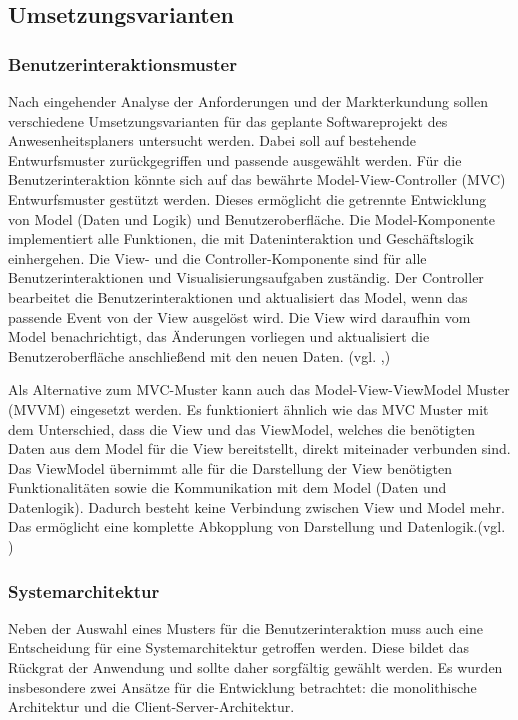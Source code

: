 \subsection{Umsetzungsvarianten}
\label{sec:Umsetzungsvarianten}


\subsubsection{Benutzerinteraktionsmuster}
\label{sec:Benutzerinteraktionsmuster}
Nach eingehender Analyse der Anforderungen und der Markterkundung sollen verschiedene Umsetzungsvarianten für das geplante Softwareprojekt des Anwesenheitsplaners untersucht werden. Dabei soll auf bestehende Entwurfsmuster zurückgegriffen und passende ausgewählt werden. Für die Benutzerinteraktion könnte sich auf das bewährte Model-View-Controller (MVC) Entwurfsmuster gestützt werden. Dieses ermöglicht die getrennte Entwicklung von Model (Daten und Logik) und Benutzeroberfläche. Die Model-Komponente implementiert alle Funktionen, die mit Dateninteraktion und Geschäftslogik einhergehen. Die View- und die Controller-Komponente sind für alle Benutzerinteraktionen und Visualisierungsaufgaben zuständig. Der Controller bearbeitet die Benutzerinteraktionen und aktualisiert das Model, wenn das passende Event von der View ausgelöst wird. Die View wird daraufhin vom Model benachrichtigt, das Änderungen vorliegen und aktualisiert die Benutzeroberfläche anschließend mit den neuen Daten. (vgl. \cite[S. 847 - 857]{goll2011},\cite{MVC})

Als Alternative zum MVC-Muster kann auch das Model-View-ViewModel Muster (MVVM) eingesetzt werden. Es funktioniert ähnlich wie das MVC Muster mit dem Unterschied, dass die View und das ViewModel, welches die benötigten Daten aus dem Model für die View bereitstellt, direkt miteinader verbunden sind. Das ViewModel übernimmt alle für die Darstellung der View benötigten Funktionalitäten sowie die Kommunikation mit dem Model (Daten und Datenlogik). Dadurch besteht keine Verbindung zwischen View und Model mehr. Das ermöglicht eine komplette Abkopplung von Darstellung und Datenlogik.(vgl. \cite{MVVM})

\subsubsection{Systemarchitektur}
\label{sec:Systemarchitektur}
Neben der Auswahl eines Musters für die Benutzerinteraktion muss auch eine Entscheidung für eine Systemarchitektur getroffen werden. Diese bildet das Rückgrat der Anwendung und sollte daher sorgfältig gewählt werden. Es wurden insbesondere zwei Ansätze für die Entwicklung betrachtet: die monolithische Architektur und die Client-Server-Architektur.


